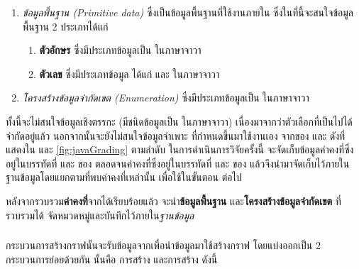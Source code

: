 \begin{enumerate}
    \item {\it ข้อมูลพื้นฐาน (Primitive data)} ซึ่งเป็นข้อมูลพื้นฐานที่ใช้งานภายใน{\class} ซึ่งในที่นี้จะสนใจข้อมูลพื้นฐาน 2 ประเภทได้แก่
        \begin{enumerate}
            \item {\bf ตัวอักษร} ซึ่งมีประเภทข้อมูลเป็น  ในภาษาจาวา
            \item {\bf ตัวเลข} ซึ่งมีประเภทข้อมูล ได้แก่  และ ในภาษาจาวา
        \end{enumerate}
    \item {\it โครงสร้างข้อมูลจำกัดเขต (Enumeration)} ซึ่งมีประเภทข้อมูลเป็น  ในภาษาจาวา
\end{enumerate}

ทั้งนี้จะไม่สนใจข้อมูลเชิงตรรกะ (มีชนิดข้อมูลเป็น  ในภาษาจาวา) เนื่องมาจากว่าตัวเลือกที่เป็นไปได้จำกัดอยู่แล้ว 
นอกจากนั้นจะยังไม่สนใจข้อมูลจำเพาะ ที่กำหนดขึ้นมาใช้งานเอง 
จาก{\sourcecode}ของ{\class}  และ ดังที่แสดงใน 
 และ \ref{fig:javaGrading} ตามลำดับ ในการดำเนินการวิจัยครั้งนี้ 
จะจัดเก็บข้อมูลค่าคงที่ซึ่งอยู่ในบรรทัดที่  และ  ของ{\class} 
ตลอดจนค่าคงที่ซึ่งอยู่ในบรรทัดที่  และ  ของ{\class}  
แล้วจึงนำมาจัดเก็บไว้ภายในฐานข้อมูลโดยแยกตาม{\class}ที่พบค่าคงที่เหล่านั้น เพื่อใช้ในขั้นตอน {\bf \testcaseGeneration} ต่อไป

หลังจากรวบรวม{\bf ค่าคงที่}จาก{\sourcecode}ได้เรียบร้อยแล้ว จะนำ{\bf ข้อมูลพื้นฐาน} และ{\bf โครงสร้างข้อมูลจำกัดเขต} ที่รวบรวมได้
จัดหมวดหมู่และบันทึกไว้ภายใน{\it ฐานข้อมูล}

\subsubsection{\graphCreation}
\label{sec:sub:sub:graphCreation}

กระบวนการสร้างกราฟนั้นจะรับข้อมูล{\sourcecode}จาก{\Repository}เพื่อนำข้อมูลมาใช้สร้างกราฟ โดยแบ่งออกเป็น 2 กระบวนการย่อยด้วยกัน 
นั้นคือ การสร้าง{\scg} และการสร้าง{\cfg} ดังนี้

